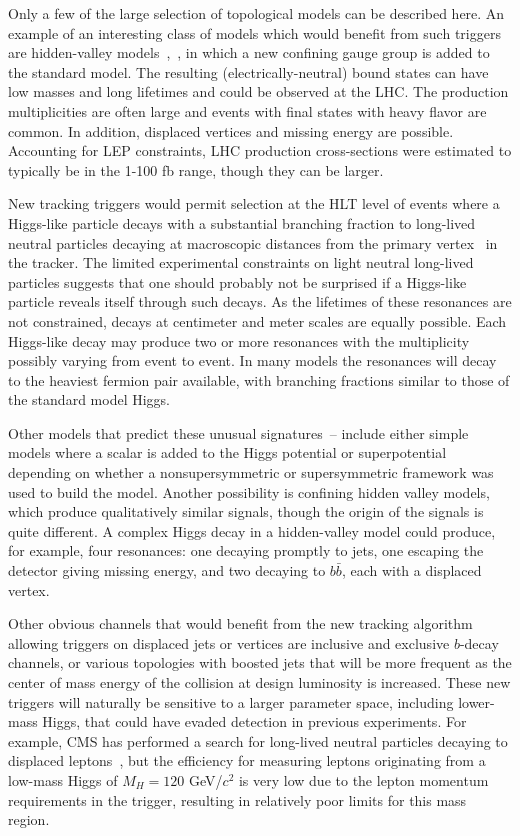 \documentclass{JINST}
\begin{document}
Only a few of the large selection of topological models can be described here. An example of an
interesting class of models which would benefit from such triggers are hidden-valley models~\cite{bib:hiddenvalley},~\cite{Han:2007ae},
in which a new confining gauge group is added to the standard model. The resulting (electrically-neutral) bound states can have
 low masses and long lifetimes and could be observed at the LHC. The production multiplicities are often large and events with final states with heavy flavor are
common. In addition, displaced vertices and missing energy are possible. Accounting for LEP constraints, LHC production 
cross-sections were estimated to typically be in the 1-100 fb range, though they can be larger.

New tracking triggers would permit selection at the HLT level of events where a Higgs-like particle decays with a substantial branching fraction to long-lived neutral particles decaying
at macroscopic distances from the primary vertex~\cite{bib:hiddenvalley} in the tracker. The limited experimental constraints on light neutral long-lived particles
suggests that one should probably not be surprised if a Higgs-like particle reveals itself  through such decays. As the lifetimes of these resonances 
are not constrained, decays at centimeter and meter scales are equally possible. Each Higgs-like decay may produce two or more resonances 
with the multiplicity possibly varying from event to event. In many models the resonances will decay to the heaviest fermion 
pair available, with branching fractions similar to those of the standard model Higgs.

Other models that predict these unusual signatures~\cite{bib:hiddenvalley}--\cite{Strassler:2006ri} include either simple models where a scalar is added to the Higgs potential or superpotential depending on whether a nonsupersymmetric
or supersymmetric framework was used to build the model. Another possibility is confining hidden valley models, which produce qualitatively similar signals, though the origin of the signals is 
quite different.  A complex Higgs decay in a hidden-valley model could produce, for example, four resonances: one decaying promptly to jets,
 one escaping the detector giving missing energy, and two decaying to $b\bar{b}$, each with a displaced vertex.  

Other obvious channels that would benefit from the new tracking algorithm allowing triggers on displaced jets
or vertices are inclusive and exclusive $b$-decay channels, or various topologies with boosted jets that will
be more frequent as the center of mass energy of the collision at design luminosity is increased. These new
triggers will naturally be sensitive to a larger parameter space, including lower-mass Higgs, that could have
evaded detection in previous experiments. For example, CMS has performed a search for long-lived neutral
particles decaying to displaced leptons~\cite{Chatrchyan:2012jna}, but the efficiency for measuring leptons
originating from a low-mass Higgs of $M_H = 120$ GeV/$c^2$ is very low due to the lepton momentum requirements
in the trigger, resulting in relatively poor limits for this mass region.
\end{document}
